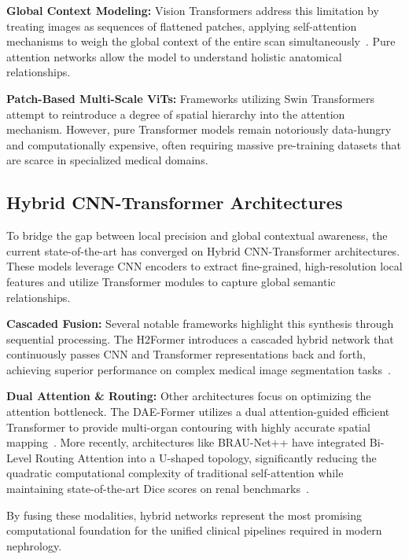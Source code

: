 \documentclass[pdflatex,sn-mathphys-num]{sn-jnl}%
\begin{document}
\textbf{Global Context Modeling:} Vision Transformers address this limitation by treating images as sequences of flattened patches, applying self-attention mechanisms to weigh the global context of the entire scan simultaneously~\cite{islam2022vision}. Pure attention networks allow the model to understand holistic anatomical relationships.

\textbf{Patch-Based Multi-Scale ViTs:} Frameworks utilizing Swin Transformers attempt to reintroduce a degree of spatial hierarchy into the attention mechanism. However, pure Transformer models remain notoriously data-hungry and computationally expensive, often requiring massive pre-training datasets that are scarce in specialized medical domains. 

\subsection{Hybrid CNN-Transformer Architectures}
To bridge the gap between local precision and global contextual awareness, the current state-of-the-art has converged on Hybrid CNN-Transformer architectures. These models leverage CNN encoders to extract fine-grained, high-resolution local features and utilize Transformer modules to capture global semantic relationships.

\textbf{Cascaded Fusion:} Several notable frameworks highlight this synthesis through sequential processing. The H2Former introduces a cascaded hybrid network that continuously passes CNN and Transformer representations back and forth, achieving superior performance on complex medical image segmentation tasks~\cite{he2023h2former}.

\textbf{Dual Attention \& Routing:} Other architectures focus on optimizing the attention bottleneck. The DAE-Former utilizes a dual attention-guided efficient Transformer to provide multi-organ contouring with highly accurate spatial mapping~\cite{azad2023daeformer}. More recently, architectures like BRAU-Net++ have integrated Bi-Level Routing Attention into a U-shaped topology, significantly reducing the quadratic computational complexity of traditional self-attention while maintaining state-of-the-art Dice scores on renal benchmarks~\cite{lan2024braunet}.

By fusing these modalities, hybrid networks represent the most promising computational foundation for the unified clinical pipelines required in modern nephrology.

\end{document}
